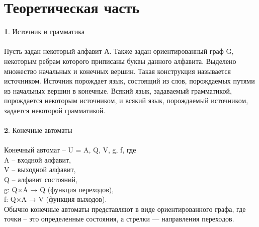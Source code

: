 \documentclass[a4paper,12pt]{article} %
\begin{document}
\fontsize{14}{16pt}\selectfont
\tableofcontents 
\newpage
\section{Теоретическая часть}
\textbf
1.	Источник и грамматика\\ \\
Пусть задан некоторый алфавит А. Также задан ориентированный граф G, некоторым ребрам которого приписаны буквы данного алфавита. Выделено множество начальных и конечных вершин. Такая конструкция называется источником. Источник порождает язык, состоящий из слов, порождаемых путями из начальных вершин в конечные. Всякий язык, задаваемый грамматикой, порождается некоторым источником, и всякий язык, порождаемый источником, задается некоторой грамматикой.\\  \\
\textbf
2.	Конечные автоматы\\ \\
Конечный автомат – U = {A, Q, V, g, f}, где
\\A – входной алфавит,
\\V – выходной алфавит,
\\Q – алфавит состояний,
\\g: Q×A → Q (функция переходов),
\\f: Q×A → V (функция выходов).
\\Обычно конечные автоматы представляют в виде ориентированного графа, где точки – это определенные состояния, а стрелки — направления переходов.\\ \\
\newpage
\end{document}
